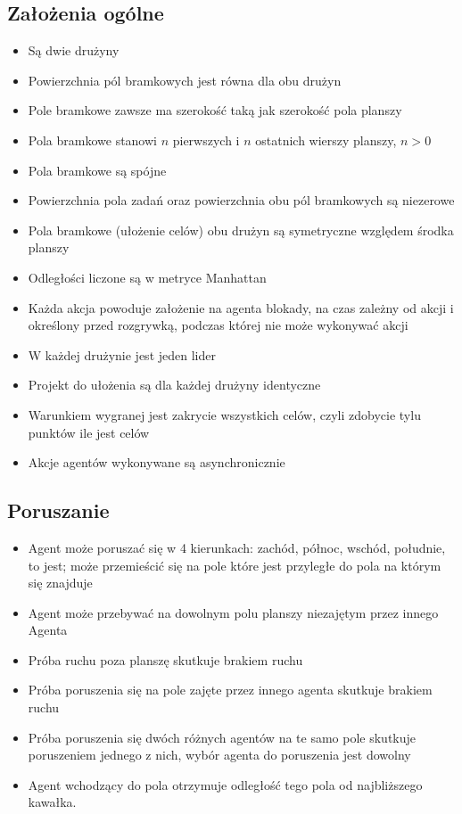 \documentclass[Dokumentacja.tex]{subfiles}
\begin{document}
\subsection{Założenia ogólne}
\begin{itemize}
    \item Są dwie drużyny
    \item Powierzchnia pól bramkowych jest równa dla obu drużyn
    \item Pole bramkowe zawsze ma szerokość taką jak szerokość pola planszy
    \item Pola bramkowe stanowi $n$ pierwszych i $n$ ostatnich wierszy planszy, $n > 0$
    \item Pola bramkowe są spójne
    \item Powierzchnia pola zadań oraz powierzchnia obu pól bramkowych są niezerowe
    \item Pola bramkowe (ułożenie celów) obu drużyn są symetryczne względem środka planszy
    \item Odległości liczone są w metryce Manhattan
    \item Każda akcja powoduje założenie na agenta blokady, na czas zależny od akcji i określony przed rozgrywką, podczas której nie może wykonywać akcji
    \item W każdej drużynie jest jeden lider
    \item Projekt do ułożenia są dla każdej drużyny identyczne
    \item Warunkiem wygranej jest zakrycie wszystkich celów, czyli zdobycie tylu punktów ile jest celów
    \item Akcje agentów wykonywane są asynchronicznie
\end{itemize}
\subsection{Poruszanie}
\begin{itemize}
    \item Agent może poruszać się w 4 kierunkach: zachód, północ, wschód, południe, to jest; może przemieścić się na pole które jest przyległe do pola na którym się znajduje
    \item Agent może przebywać na dowolnym polu planszy niezajętym przez innego Agenta
    \item Próba ruchu poza planszę skutkuje brakiem ruchu
    \item Próba poruszenia się na pole zajęte przez innego agenta skutkuje brakiem ruchu
    \item Próba poruszenia się dwóch różnych agentów na te samo pole skutkuje poruszeniem jednego z nich, wybór agenta do poruszenia jest dowolny
    \item Agent wchodzący do pola otrzymuje odległość tego pola od najbliższego kawałka.
\end{itemize}
\end{document}
